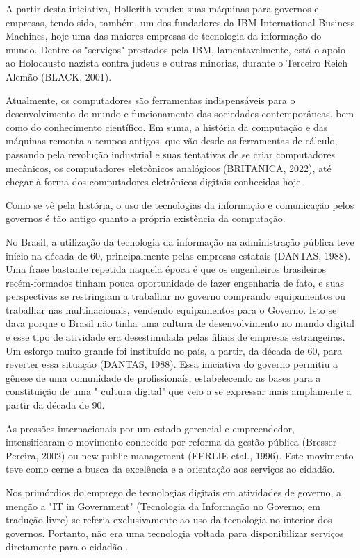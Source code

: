 A partir desta iniciativa, Hollerith vendeu suas máquinas para governos e empresas, tendo sido, também, um dos fundadores da IBM-International Business Machines, hoje uma das maiores empresas de tecnologia da informação do mundo. Dentre os "serviços" prestados pela IBM, lamentavelmente, está o apoio ao Holocausto nazista contra judeus e outras minorias, durante o Terceiro Reich Alemão (BLACK, 2001).

Atualmente, os computadores são ferramentas indispensáveis para o desenvolvimento do mundo e funcionamento das sociedades contemporâneas, bem como do conhecimento científico. Em suma, a história da computação e das máquinas remonta a tempos antigos, que vão desde as ferramentas de cálculo, passando pela revolução industrial e suas tentativas de se criar computadores mecânicos, os computadores eletrônicos analógicos  (BRITANICA, 2022), até chegar à forma dos computadores eletrônicos digitais conhecidas hoje.

Como se vê pela história, o uso de tecnologias da informação e comunicação pelos governos é tão antigo quanto a própria existência da computação.

No Brasil, a utilização da tecnologia da informação na administração pública teve início na década de 60, principalmente pelas empresas estatais (DANTAS, 1988). Uma frase bastante repetida naquela época é que os engenheiros brasileiros recém-formados tinham pouca oportunidade de fazer engenharia de fato, e suas perspectivas se restringiam a trabalhar no governo comprando equipamentos ou trabalhar nas multinacionais, vendendo equipamentos para o Governo. Isto se dava porque o Brasil não tinha uma cultura de desenvolvimento no mundo digital e esse tipo de atividade era desestimulada pelas filiais de empresas estrangeiras. Um esforço muito grande foi instituído no país, a partir, da década de 60, para reverter essa situação (DANTAS, 1988). Essa iniciativa do governo permitiu a gênese de uma comunidade de profissionais, estabelecendo as bases para a constituição de uma " cultura digital" que veio a se expressar mais amplamente a partir da década de 90.

As pressões internacionais por um estado gerencial e empreendedor, intensificaram o movimento conhecido por reforma da gestão pública (Bresser-Pereira, 2002) ou new public management (FERLIE etal., 1996). Este movimento teve como cerne a busca da excelência e a orientação aos serviços ao cidadão.

Nos primórdios do emprego de tecnologias digitais em atividades de governo, a menção a "IT in Government" (Tecnologia da Informação no Governo, em tradução livre) se referia exclusivamente ao uso da tecnologia no interior dos governos. Portanto, não era uma tecnologia voltada para disponibilizar serviços diretamente para o cidadão .

